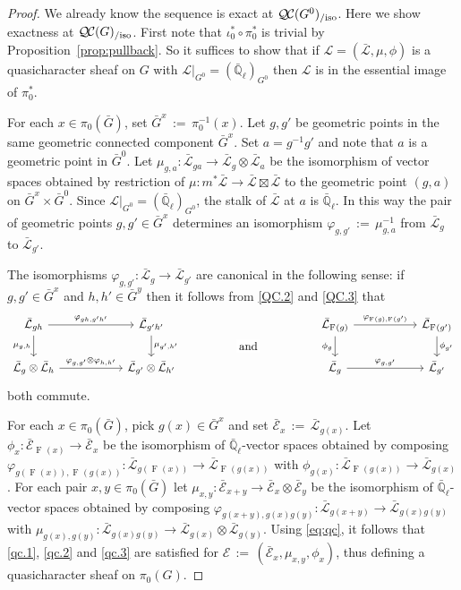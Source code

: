\documentclass{amsart}
\theoremstyle{plain}
\theoremstyle{definition}
\theoremstyle{remark}
\newcommand{\EE}{\mathbb{\bar Q}_\ell}
\newcommand{\Frob}[1]{\operatorname{F}_{#1}}
\newcommand{\ceq}{{\, :=\, }}
\newcommand{\qcs}[1]{{\mathcal{#1}}}
\newcommand{\gqcs}[1]{{\mathcal{\bar #1}}}
\newcommand{\QC}{{\mathcal{Q\hskip-0.8pt C}}}
\newcommand{\QCiso}[1]{\QC(#1)_{/\text{iso}}}
\newcommand{\bG}{\bar{G}}
\begin{document}
\begin{proof}
We already know the sequence is exact at $\QCiso{G^0}$.
Here we show exactness at $\QCiso{G}$.
First note that $\iota_0^* \circ \pi_0^*$ is trivial by Proposition~\ref{prop:pullback}.
So it suffices to show that if $\qcs{L} = (\gqcs{L},\mu,\phi)$ is a quasicharacter sheaf on $G$
with $\qcs{L}\vert_{G^0} = (\EE)_{G^0}$ then $\qcs{L}$ is in the essential image of $\pi_0^*$.

For each $x\in \pi_0(\bG)$, set $\bG^x \ceq \pi_0^{-1}(x)$.
Let $g, g'$ be geometric points in the same
geometric connected component $\bG^x$.
Set $a = g^{-1}g'$ and note that $a$ is a geometric point in $\bG^0$.
Let $\mu_{g,a} : \gqcs{L}_{ga} \to \gqcs{L}_g \otimes \gqcs{L}_a$
be the isomorphism of vector spaces obtained by restriction of
$\mu : m^*\gqcs{L} \to \gqcs{L} \boxtimes \gqcs{L}$ to the
geometric point $(g,a)$ on $\bG^x \times \bG^0$.
Since $\qcs{L}\vert_{G^0} = (\EE)_{G^0}$,
the stalk of $\gqcs{L}$ at $a$ is $\EE$.
In this way the pair of geometric points $g, g' \in \bG^x$
determines an isomorphism $\varphi_{g,g'} \ceq \mu_{g,a}^{-1}$
from $\gqcs{L}_{g}$ to $\gqcs{L}_{g'}$.

The isomorphisms $\varphi_{g,g'}: \gqcs{L}_{g} \to \gqcs{L}_{g'}$ are canonical
in the following sense: if $g,g'\in \bG^x$ and $h,h'\in \bG^y$
then it follows from \ref{QC.2} and \ref{QC.3}
that
 \begin{equation}\label{eq:qc}
  \begin{tikzcd}[column sep=55]
   \gqcs{L}_{gh} \arrow{r}{\varphi_{gh,g'h'}} \arrow[swap]{d}{\mu_{g,h}}
  & \gqcs{L}_{g'h'} \arrow{d}{\mu_{g',h'}}
  &\arrow[draw=none]{d}[pos=.4,description]{\text{\normalsize{and}}}
  &  \gqcs{L}_{\Frob{}(g)} \arrow{r}{\varphi_{\Frob{}(g),\Frob{}(g')}} \arrow[swap]{d}{\phi_{g}} & \gqcs{L}_{\Frob{}(g')} \arrow{d}{\phi_{g'}} \\
  \gqcs{L}_{g} \otimes \gqcs{L}_{h} \arrow{r}{\varphi_{g,g'}\otimes \varphi_{h,h'}}
  & \gqcs{L}_{g'} \otimes \gqcs{L}_{h'}
  & {}
  & \gqcs{L}_{g} \arrow{r}{\varphi_{g,g'}} & \gqcs{L}_{g'}
  \end{tikzcd}
 \end{equation}
both commute.

For each $x\in \pi_0(\bG)$, pick $g(x)\in \bG^x$
and set $\gqcs{E}_x \ceq \gqcs{L}_{g(x)}$.
Let $\phi_x : \gqcs{E}_{\Frob{}(x)} \to \gqcs{E}_x$
be the isomorphism of $\EE$-vector spaces obtained by composing
$\varphi_{g(\Frob{}(x)),\Frob{}(g(x))} : \gqcs{L}_{g(\Frob{}(x))} \to \gqcs{L}_{\Frob{}(g(x))}$
with $\phi_{g(x)} : \gqcs{L}_{\Frob{}(g(x))} \to \gqcs{L}_{g(x)}$.
For each pair $x,y\in \pi_0(\bG)$
let $\mu_{x,y} : \gqcs{E}_{x+y}\to \gqcs{E}_x\otimes \gqcs{E}_y$
be the isomorphism of $\EE$-vector spaces obtained by composing
$\varphi_{g(x+y),g(x)g(y)} : \gqcs{L}_{g(x+y)} \to \gqcs{L}_{g(x)g(y)}$
with $\mu_{g(x),g(y)} : \gqcs{L}_{g(x)g(y)} \to \gqcs{L}_{g(x)}\otimes \gqcs{L}_{g(y)}$.
Using \eqref{eq:qc}, it follows that \ref{qc.1}, \ref{qc.2} and \ref{qc.3} are satisfied for
$\qcs{E} \ceq (\gqcs{E}_x, \mu_{x,y}, \phi_x)$, thus defining a quasicharacter sheaf on $\pi_0(G)$.


\end{proof}
\end{document}
